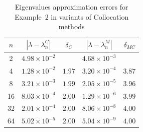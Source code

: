 \documentclass[]{interact}
\renewcommand{\arraystretch}{1.32}
\theoremstyle{plain}%
\theoremstyle{definition}
\theoremstyle{remark}
\begin{document}
\begin{table}[h!]
	\small
	\centering
	\setlength{\tabcolsep}{10pt}
	\renewcommand{\arraystretch}{1.2}
	\caption{Eigenvalues approximation errors for Example~$2$  in variants of Collocation methods}
	\label{table:03}
	\begin{tabular}{|c|c|c|c|c|}
		\hline
		$n$ & $|\lambda - \lambda_n^C|$ & $\delta_{C}$ & $|\lambda - \lambda_n^M|$ & $\delta_{MC}$ \\[3pt]
		\hline
		2   & $4.98 \times 10^{-2}$ &            & $4.68 \times 10^{-3}$ &          \\[3pt]
		4   & $1.28 \times 10^{-2}$ & $1.97$     & $3.20 \times 10^{-4}$ & $3.87$     \\[3pt]
		8   & $3.21 \times 10^{-3}$ & $1.99$     & $2.05 \times 10^{-5}$ & $3.96$     \\[3pt]
		16  & $8.03 \times 10^{-4}$ & $2.00$     & $1.29 \times 10^{-6}$ & $3.99$     \\[3pt]
		32  & $2.01 \times 10^{-4}$ & $2.00$     & $8.06 \times 10^{-8}$ & $4.00$     \\[3pt]
		64  & $5.02 \times 10^{-5}$ & $2.00$     & $5.04 \times 10^{-9}$ & $4.00$     \\[3pt]
		\hline
	\end{tabular}
\end{table}
\end{document}
